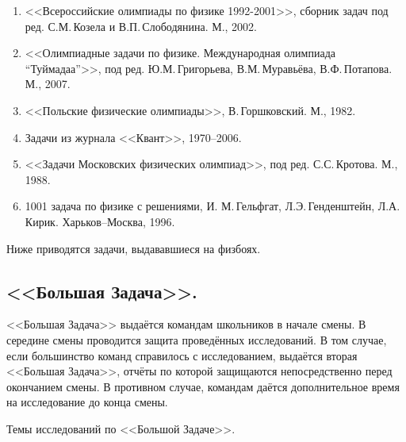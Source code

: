 \documentclass[12pt,a4paper,oneside,draft]{scrartcl}
\begin{document}
\begin{enumerate}
\item <<Всероссийские олимпиады по физике 1992-2001>>, сборник задач
  под ред. С.М.\,Козела и В.П.\,Слободянина. М., 2002.
\item <<Олимпиадные задачи по физике. Международная олимпиада
  ``Туймадаа''>>, под ред. Ю.М.\,Григорьева, В.М.\,Муравьёва,
  В.Ф.\,Потапова. М., 2007.
\item <<Польские физические олимпиады>>, В.\,Горшковский. М., 1982.
\item Задачи из журнала <<Квант>>, 1970--2006. 
\item <<Задачи Московских физических олимпиад>>, под ред.
  С.С.\,Кротова. М., 1988.
\item 1001 задача по физике с решениями, И. М.\,Гельфгат, 
  Л.Э.\,Генденштейн, Л.А.\,Кирик. Харьков--Москва, 1996.
\end{enumerate}

Ниже приводятся задачи, выдававшиеся на физбоях. 


% 

% 

% 

% 

% 

% 


\parindent=5mm
\subsection{<<Большая Задача>>.}
\label{sec:bz}

<<Большая Задача>> выдаётся командам школьников в начале смены. В
середине смены проводится защита проведённых исследований. В том
случае, если большинство команд справилось с исследованием, выдаётся
вторая <<Большая Задача>>, отчёты по которой защищаются
непосредственно перед окончанием смены. В противном случае, командам
даётся дополнительное время на исследование до конца смены.

\begin{center}
  \textsf{Темы исследований по <<Большой Задаче>>.}
\end{center}
\end{document}

